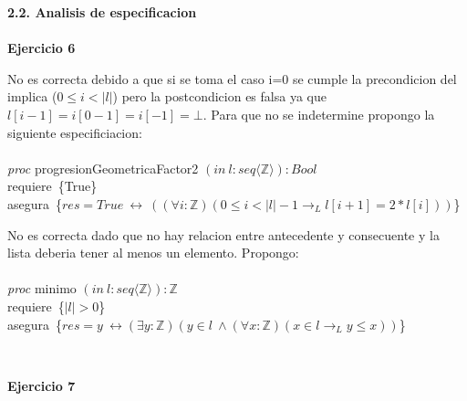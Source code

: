 \documentclass{article}
\begin{document}
\noindent\huge{\textbf{2.2. Analisis de especificacion}}\\\\
\LARGE{\textbf{Ejercicio 6}}
\begin{itemize}
    \item [a) ] \Large{No es correcta debido a que si se toma el caso i=0 se cumple la precondicion del implica ($0\leq i<|l|$) pero la postcondicion es falsa ya que $l[i-1]=i[0-1]=i[-1]=\bot$. Para que no se indetermine propongo la siguiente especificiacion:\\\\
    \textit{proc} progresionGeometricaFactor2 $(in\ l:seq\langle \mathbb{Z}\rangle):Bool$\\
    requiere\ \{True\}\\
    asegura\ \{$res=True \ \leftrightarrow\ ((\forall i:\mathbb{Z})(0\leq i<|l|-1 \to_L l[i+1]=2*l[i]))$\}\\

    \item[b) ] \Large{No es correcta dado que no hay relacion entre antecedente y consecuente y la lista deberia tener al menos un elemento. Propongo:\\\\
    \textit{proc} minimo $(in\ l:seq\langle \mathbb{Z}\rangle):\mathbb{Z}$\\
    requiere\ \{$|l|>0$\}}\\
    asegura\ \{$res = y\ \leftrightarrow(\exists y:\mathbb{Z})(y\in l\ \land (\forall x:\mathbb{Z})(x\in l \to_L y\leq x))$\}}\\
\end{itemize}
\LARGE{\textbf{Ejercicio 7}}\\
\end{document}
